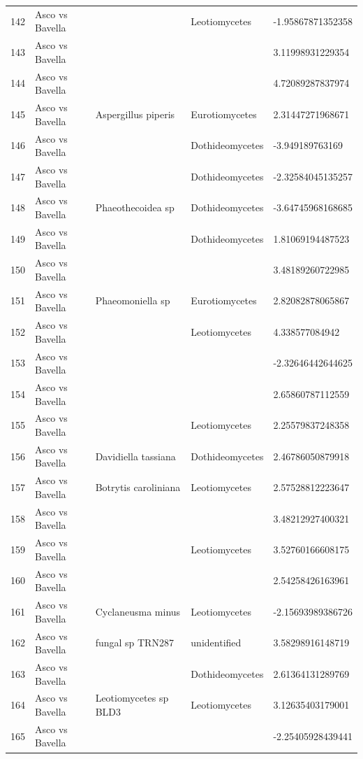 \documentclass[12pt]{article}\usepackage[]{graphicx}\usepackage[]{color}
\numberwithin{figure}{section}
\begin{document}
\begin{table}[ht]
\begin{tabular}{lllll}
  142 & Asco vs Bavella &  & Leotiomycetes & -1.95867871352358 \\ 
  143 & Asco vs Bavella &  &  & 3.11998931229354 \\ 
  144 & Asco vs Bavella &  &  & 4.72089287837974 \\ 
  145 & Asco vs Bavella & Aspergillus piperis & Eurotiomycetes & 2.31447271968671 \\ 
  146 & Asco vs Bavella &  & Dothideomycetes & -3.949189763169 \\ 
  147 & Asco vs Bavella &  & Dothideomycetes & -2.32584045135257 \\ 
  148 & Asco vs Bavella & Phaeothecoidea sp & Dothideomycetes & -3.64745968168685 \\ 
  149 & Asco vs Bavella &  & Dothideomycetes & 1.81069194487523 \\ 
  150 & Asco vs Bavella &  &  & 3.48189260722985 \\ 
  151 & Asco vs Bavella & Phaeomoniella sp & Eurotiomycetes & 2.82082878065867 \\ 
  152 & Asco vs Bavella &  & Leotiomycetes & 4.338577084942 \\ 
  153 & Asco vs Bavella &  &  & -2.32646442644625 \\ 
  154 & Asco vs Bavella &  &  & 2.65860787112559 \\ 
  155 & Asco vs Bavella &  & Leotiomycetes & 2.25579837248358 \\ 
  156 & Asco vs Bavella & Davidiella tassiana & Dothideomycetes & 2.46786050879918 \\ 
  157 & Asco vs Bavella & Botrytis caroliniana & Leotiomycetes & 2.57528812223647 \\ 
  158 & Asco vs Bavella &  &  & 3.48212927400321 \\ 
  159 & Asco vs Bavella &  & Leotiomycetes & 3.52760166608175 \\ 
  160 & Asco vs Bavella &  &  & 2.54258426163961 \\ 
  161 & Asco vs Bavella & Cyclaneusma minus & Leotiomycetes & -2.15693989386726 \\ 
  162 & Asco vs Bavella & fungal sp TRN287 & unidentified & 3.58298916148719 \\ 
  163 & Asco vs Bavella &  & Dothideomycetes & 2.61364131289769 \\ 
  164 & Asco vs Bavella & Leotiomycetes sp BLD3 & Leotiomycetes & 3.12635403179001 \\ 
  165 & Asco vs Bavella &  &  & -2.25405928439441 \\ 

\end{tabular}
\end{table}
\end{document}
